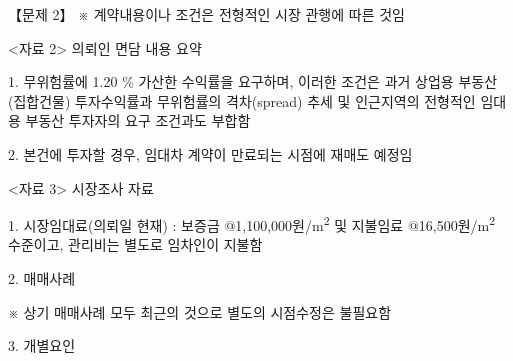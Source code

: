 \begin{longquestion}{【문제 2】}
※ 계약내용이나 조건은 전형적인 시장 관행에 따른 것임 \par
<자료 2> 의뢰인 면담 내용 요약 \par
1. 무위험률에 1.20 \% 가산한 수익률을 요구하며, 이러한 조건은 과거 상업용 부동산(집합건물) 투자수익률과 무위험률의 격차(spread) 추세 및 인근지역의 전형적인 임대용 부동산 투자자의 요구 조건과도 부합함 \par
2. 본건에 투자할 경우, 임대차 계약이 만료되는 시점에 재매도 예정임 \par
<자료 3> 시장조사 자료 \par
1. 시장임대료(의뢰일 현재) : 보증금 @1,100,000원/m\textsuperscript{2} 및 지불임료 @16,500원/m\textsuperscript{2} 수준이고, 관리비는 별도로 임차인이 지불함 \par
2. 매매사례 \par
{\small\centering
{}\par}

※ 상기 매매사례 모두 최근의 것으로 별도의 시점수정은 불필요함 \par
3. 개별요인 \par
{\small\centering
{}\par}


\end{longquestion}
